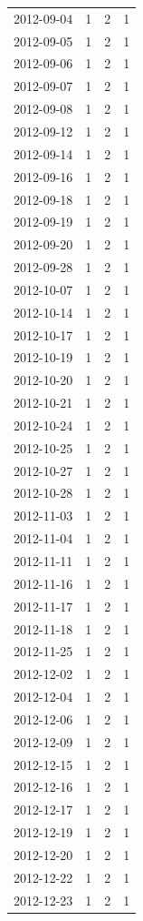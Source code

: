 \begin{tabular}{lrrr}
2012-09-04 & 1 & 2 & 1 \\
2012-09-05 & 1 & 2 & 1 \\
2012-09-06 & 1 & 2 & 1 \\
2012-09-07 & 1 & 2 & 1 \\
2012-09-08 & 1 & 2 & 1 \\
2012-09-12 & 1 & 2 & 1 \\
2012-09-14 & 1 & 2 & 1 \\
2012-09-16 & 1 & 2 & 1 \\
2012-09-18 & 1 & 2 & 1 \\
2012-09-19 & 1 & 2 & 1 \\
2012-09-20 & 1 & 2 & 1 \\
2012-09-28 & 1 & 2 & 1 \\
2012-10-07 & 1 & 2 & 1 \\
2012-10-14 & 1 & 2 & 1 \\
2012-10-17 & 1 & 2 & 1 \\
2012-10-19 & 1 & 2 & 1 \\
2012-10-20 & 1 & 2 & 1 \\
2012-10-21 & 1 & 2 & 1 \\
2012-10-24 & 1 & 2 & 1 \\
2012-10-25 & 1 & 2 & 1 \\
2012-10-27 & 1 & 2 & 1 \\
2012-10-28 & 1 & 2 & 1 \\
2012-11-03 & 1 & 2 & 1 \\
2012-11-04 & 1 & 2 & 1 \\
2012-11-11 & 1 & 2 & 1 \\
2012-11-16 & 1 & 2 & 1 \\
2012-11-17 & 1 & 2 & 1 \\
2012-11-18 & 1 & 2 & 1 \\
2012-11-25 & 1 & 2 & 1 \\
2012-12-02 & 1 & 2 & 1 \\
2012-12-04 & 1 & 2 & 1 \\
2012-12-06 & 1 & 2 & 1 \\
2012-12-09 & 1 & 2 & 1 \\
2012-12-15 & 1 & 2 & 1 \\
2012-12-16 & 1 & 2 & 1 \\
2012-12-17 & 1 & 2 & 1 \\
2012-12-19 & 1 & 2 & 1 \\
2012-12-20 & 1 & 2 & 1 \\
2012-12-22 & 1 & 2 & 1 \\
2012-12-23 & 1 & 2 & 1 \\

\end{tabular}
